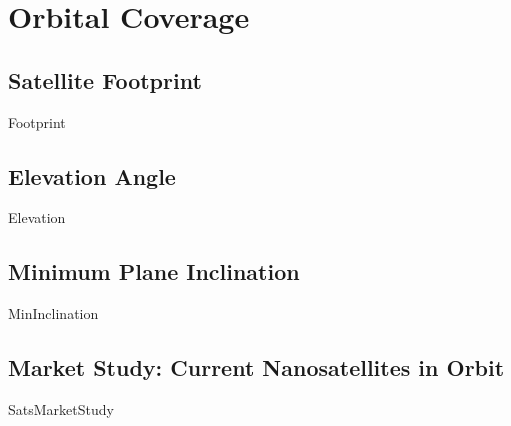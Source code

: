 \chapter{Orbital Coverage}


\section{Satellite Footprint}
{Footprint}

\section{Elevation Angle}
{Elevation}

\section{Minimum Plane Inclination}
{MinInclination}

\section{Market Study: Current Nanosatellites in Orbit}
{SatsMarketStudy}